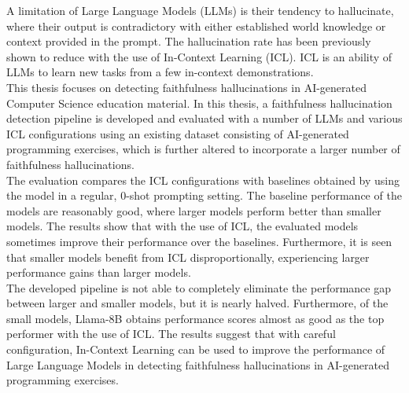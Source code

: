 \documentclass[english, 12pt, a4paper, sci, utf8, a-2b, online]{latex/definitions/aaltothesis}
\date{\today}
\begin{document}
\makecoverpage

\makecopyrightpage

\clearpage

\begin{abstractpage}[english]
A limitation of Large Language Models (LLMs) is their tendency to hallucinate, where their output is contradictory with either established world knowledge or context provided in the prompt. The hallucination rate has been previously shown to reduce with the use of In-Context Learning (ICL). ICL is an ability of LLMs to learn new tasks from a few in-context demonstrations. \\

\noindent
This thesis focuses on detecting faithfulness hallucinations in AI-generated Computer Science education material. In this thesis, a faithfulness hallucination detection pipeline is developed and evaluated with a number of LLMs and various ICL configurations using an existing dataset consisting of AI-generated programming exercises, which is further altered to incorporate a larger number of faithfulness hallucinations. \\

\noindent
The evaluation compares the ICL configurations with baselines obtained by using the model in a regular, 0-shot prompting setting. The baseline performance of the models are reasonably good, where larger models perform better than smaller models. The results show that with the use of ICL, the evaluated models sometimes improve their performance over the baselines. Furthermore, it is seen that smaller models benefit from ICL disproportionally, experiencing larger performance gains than larger models. \\

\noindent
The developed pipeline is not able to completely eliminate the performance gap between larger and smaller models, but it is nearly halved. Furthermore, of the small models, Llama-8B obtains performance scores almost as good as the top performer with the use of ICL. The results suggest that with careful configuration, In-Context Learning can be used to improve the performance of Large Language Models in detecting faithfulness hallucinations in AI-generated programming exercises.
\end{abstractpage}
\end{document}
